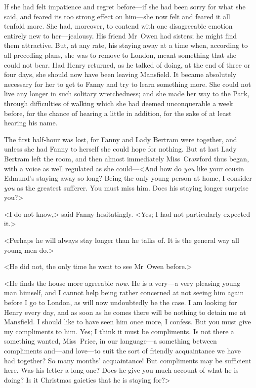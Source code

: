 If she had felt impatience and regret before—if she had been sorry for what she said, and feared its too strong effect on him—she now felt and feared it all tenfold more. She had, moreover, to contend with one disagreeable emotion entirely new to her—jealousy. His friend Mr~Owen had sisters; he might find them attractive. But, at any rate, his staying away at a time when, according to all preceding plans, she was to remove to London, meant something that she could not bear. Had Henry returned, as he talked of doing, at the end of three or four days, she should now have been leaving Mansfield. It became absolutely necessary for her to get to Fanny and try to learn something more. She could not live any longer in such solitary wretchedness; and she made her way to the Park, through difficulties of walking which she had deemed unconquerable a week before, for the chance of hearing a little in addition, for the sake of at least hearing his name.

The first half-hour was lost, for Fanny and Lady Bertram were together, and unless she had Fanny to herself she could hope for nothing. But at last Lady Bertram left the room, and then almost immediately Miss~Crawford thus began, with a voice as well regulated as she could—<And how do \textit{you}  like your cousin Edmund's staying away so long? Being the only young person at home, I consider \textit{you}  as the greatest sufferer. You must miss him. Does his staying longer surprise you?>

<I do not know,> said Fanny hesitatingly. <Yes; I had not particularly expected it.>

<Perhaps he will always stay longer than he talks of. It is the general way all young men do.>

<He did not, the only time he went to see Mr~Owen before.>

<He finds the house more agreeable \textit{now}. He is a very—a very pleasing young man himself, and I cannot help being rather concerned at not seeing him again before I go to London, as will now undoubtedly be the case. I am looking for Henry every day, and as soon as he comes there will be nothing to detain me at Mansfield. I should like to have seen him once more, I confess. But you must give my compliments to him. Yes; I think it must be compliments. Is not there a something wanted, Miss~Price, in our language—a something between compliments and—and love—to suit the sort of friendly acquaintance we have had together? So many months' acquaintance! But compliments may be sufficient here. Was his letter a long one? Does he give you much account of what he is doing? Is it Christmas gaieties that he is staying for?>

